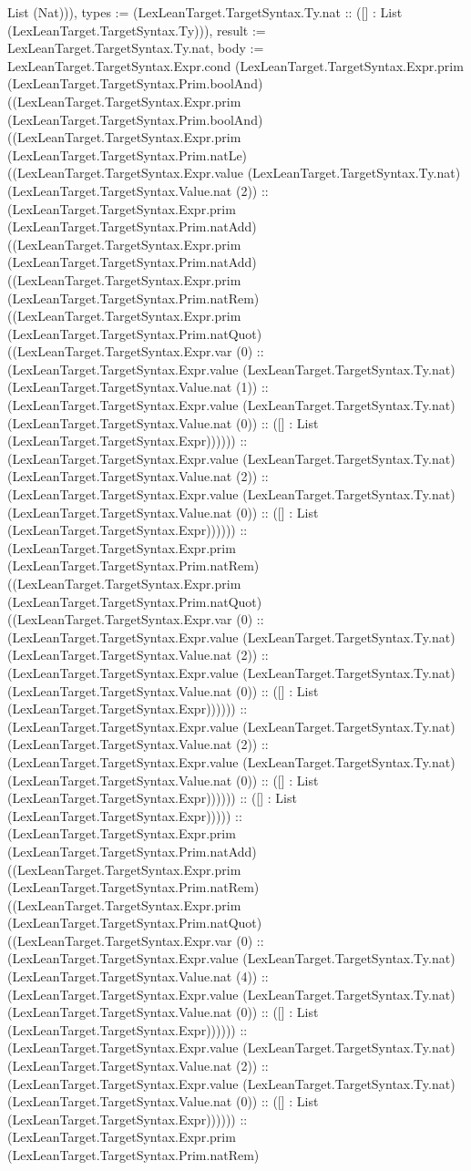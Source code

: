 \documentclass[11pt]{article}
\begin{document}
List (Nat))), types := (LexLeanTarget.TargetSyntax.Ty.nat :: ([] : List (LexLeanTarget.TargetSyntax.Ty))), result := LexLeanTarget.TargetSyntax.Ty.nat, body := LexLeanTarget.TargetSyntax.Expr.cond (LexLeanTarget.TargetSyntax.Expr.prim (LexLeanTarget.TargetSyntax.Prim.boolAnd) ((LexLeanTarget.TargetSyntax.Expr.prim (LexLeanTarget.TargetSyntax.Prim.boolAnd) ((LexLeanTarget.TargetSyntax.Expr.prim (LexLeanTarget.TargetSyntax.Prim.natLe) ((LexLeanTarget.TargetSyntax.Expr.value (LexLeanTarget.TargetSyntax.Ty.nat) (LexLeanTarget.TargetSyntax.Value.nat (2)) :: (LexLeanTarget.TargetSyntax.Expr.prim (LexLeanTarget.TargetSyntax.Prim.natAdd) ((LexLeanTarget.TargetSyntax.Expr.prim (LexLeanTarget.TargetSyntax.Prim.natAdd) ((LexLeanTarget.TargetSyntax.Expr.prim (LexLeanTarget.TargetSyntax.Prim.natRem) ((LexLeanTarget.TargetSyntax.Expr.prim (LexLeanTarget.TargetSyntax.Prim.natQuot) ((LexLeanTarget.TargetSyntax.Expr.var (0) :: (LexLeanTarget.TargetSyntax.Expr.value (LexLeanTarget.TargetSyntax.Ty.nat) (LexLeanTarget.TargetSyntax.Value.nat (1)) :: (LexLeanTarget.TargetSyntax.Expr.value (LexLeanTarget.TargetSyntax.Ty.nat) (LexLeanTarget.TargetSyntax.Value.nat (0)) :: ([] : List (LexLeanTarget.TargetSyntax.Expr)))))) :: (LexLeanTarget.TargetSyntax.Expr.value (LexLeanTarget.TargetSyntax.Ty.nat) (LexLeanTarget.TargetSyntax.Value.nat (2)) :: (LexLeanTarget.TargetSyntax.Expr.value (LexLeanTarget.TargetSyntax.Ty.nat) (LexLeanTarget.TargetSyntax.Value.nat (0)) :: ([] : List (LexLeanTarget.TargetSyntax.Expr)))))) :: (LexLeanTarget.TargetSyntax.Expr.prim (LexLeanTarget.TargetSyntax.Prim.natRem) ((LexLeanTarget.TargetSyntax.Expr.prim (LexLeanTarget.TargetSyntax.Prim.natQuot) ((LexLeanTarget.TargetSyntax.Expr.var (0) :: (LexLeanTarget.TargetSyntax.Expr.value (LexLeanTarget.TargetSyntax.Ty.nat) (LexLeanTarget.TargetSyntax.Value.nat (2)) :: (LexLeanTarget.TargetSyntax.Expr.value (LexLeanTarget.TargetSyntax.Ty.nat) (LexLeanTarget.TargetSyntax.Value.nat (0)) :: ([] : List (LexLeanTarget.TargetSyntax.Expr)))))) :: (LexLeanTarget.TargetSyntax.Expr.value (LexLeanTarget.TargetSyntax.Ty.nat) (LexLeanTarget.TargetSyntax.Value.nat (2)) :: (LexLeanTarget.TargetSyntax.Expr.value (LexLeanTarget.TargetSyntax.Ty.nat) (LexLeanTarget.TargetSyntax.Value.nat (0)) :: ([] : List (LexLeanTarget.TargetSyntax.Expr)))))) :: ([] : List (LexLeanTarget.TargetSyntax.Expr))))) :: (LexLeanTarget.TargetSyntax.Expr.prim (LexLeanTarget.TargetSyntax.Prim.natAdd) ((LexLeanTarget.TargetSyntax.Expr.prim (LexLeanTarget.TargetSyntax.Prim.natRem) ((LexLeanTarget.TargetSyntax.Expr.prim (LexLeanTarget.TargetSyntax.Prim.natQuot) ((LexLeanTarget.TargetSyntax.Expr.var (0) :: (LexLeanTarget.TargetSyntax.Expr.value (LexLeanTarget.TargetSyntax.Ty.nat) (LexLeanTarget.TargetSyntax.Value.nat (4)) :: (LexLeanTarget.TargetSyntax.Expr.value (LexLeanTarget.TargetSyntax.Ty.nat) (LexLeanTarget.TargetSyntax.Value.nat (0)) :: ([] : List (LexLeanTarget.TargetSyntax.Expr)))))) :: (LexLeanTarget.TargetSyntax.Expr.value (LexLeanTarget.TargetSyntax.Ty.nat) (LexLeanTarget.TargetSyntax.Value.nat (2)) :: (LexLeanTarget.TargetSyntax.Expr.value (LexLeanTarget.TargetSyntax.Ty.nat) (LexLeanTarget.TargetSyntax.Value.nat (0)) :: ([] : List (LexLeanTarget.TargetSyntax.Expr)))))) :: (LexLeanTarget.TargetSyntax.Expr.prim (LexLeanTarget.TargetSyntax.Prim.natRem) 
\end{document}
